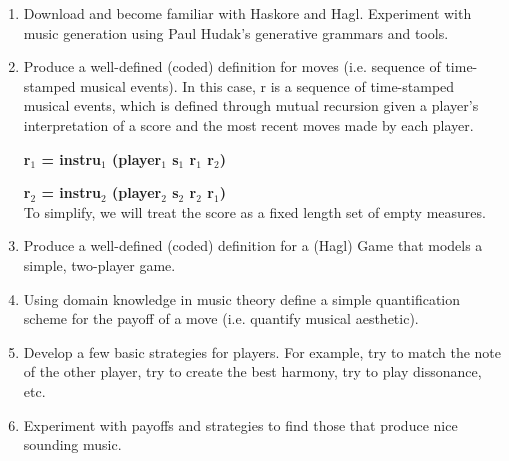\documentclass{proc}
\begin{document}
\begin{enumerate}
\item Download and become familiar with Haskore and Hagl.  Experiment with music generation using Paul Hudak's generative grammars and tools.

\item Produce a well-defined (coded) definition for moves (i.e. sequence of time-stamped musical events).  In this case, r is a sequence of time-stamped musical events, which is defined through mutual recursion given a player's interpretation of a score and the most recent moves made by each player.

\textbf{r$_{1}$ = instru$_{1}$ (player$_{1}$ s$_{1}$ r$_{1}$ r$_{2}$)} 

\textbf{r$_{2}$ = instru$_{2}$ (player$_{2}$ s$_{2}$ r$_{2}$ r$_{1}$)}  \\

 To simplify, we will treat the score as a fixed length set of empty measures.

\item Produce a well-defined (coded) definition for a (Hagl) Game that models a simple, two-player game.

\item Using domain knowledge in music theory define a simple quantification scheme for the payoff of a move (i.e. quantify musical aesthetic).

\item Develop a few basic strategies for players.  For example, try to match the note of the other player, try to create the best harmony, try to play dissonance, etc.

\item Experiment with payoffs and strategies to find those that produce nice sounding music.

\end{enumerate}
\end{document}
